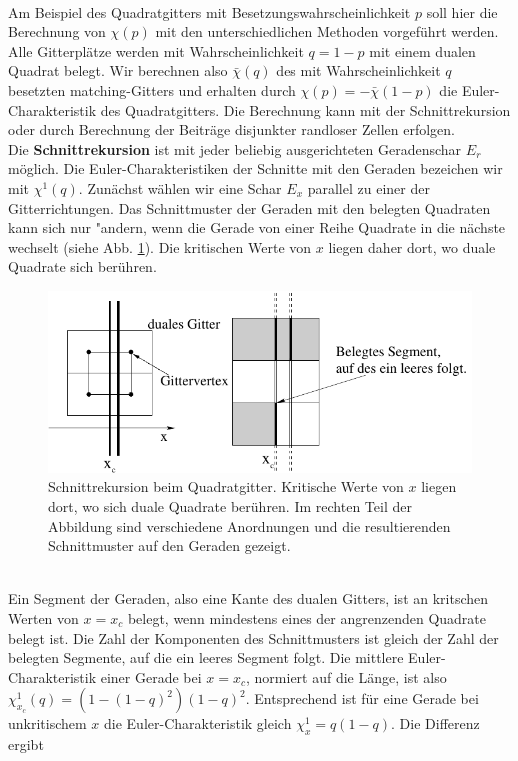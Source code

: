 \\Am Beispiel des Quadratgitters mit Besetzungswahrscheinlichkeit $p$ soll hier die Berechnung von $\chi(p)$ mit den unterschiedlichen Methoden vorgef\"uhrt werden. Alle Gitterpl\"atze werden mit Wahrscheinlichkeit $q=1-p$ mit einem dualen Quadrat belegt. Wir berechnen also $\bar{\chi}(q)$ des mit Wahrscheinlichkeit $q$ besetzten matching-Gitters und erhalten durch $\chi(p)=-\bar{\chi}(1-p)$ die Euler-Charakteristik des Quadratgitters. Die Berechnung kann mit der Schnittrekursion oder durch Berechnung der Beitr\"age disjunkter randloser Zellen erfolgen.\\
Die \textbf{Schnittrekursion} ist mit jeder beliebig ausgerichteten Geradenschar $E_r$ m\"oglich. Die Euler-Charakteristiken der Schnitte mit den Geraden bezeichen wir mit $\chi^1(q)$. Zun\"achst w\"ahlen wir eine Schar $E_x$ parallel zu einer der Gitterrichtungen. Das Schnittmuster der Geraden mit den belegten Quadraten kann sich nur "andern, wenn die Gerade von einer Reihe Quadrate in die n\"achste wechselt (siehe Abb. \ref{fig:schnittquadrat}). Die kritischen Werte von $x$ liegen daher dort, wo duale Quadrate sich ber\"uhren.  
\begin{figure}[hbtp]
  \centering
  \includegraphics{./Euler-figs/schnittquadrat}
  \caption{Schnittrekursion beim Quadratgitter. Kritische Werte von $x$ liegen dort, wo sich duale Quadrate ber\"uhren. Im rechten Teil der Abbildung sind verschiedene Anordnungen und die resultierenden Schnittmuster auf den Geraden gezeigt.}
  \label{fig:schnittquadrat}
\end{figure}
\\Ein Segment der Geraden, also eine Kante des dualen Gitters, ist an kritschen Werten von $x=x_c$ belegt, wenn mindestens eines der angrenzenden Quadrate belegt ist. Die Zahl der Komponenten des Schnittmusters ist gleich der Zahl der belegten Segmente, auf die ein leeres Segment folgt. Die mittlere Euler-Charakteristik einer Gerade bei $x=x_c$, normiert auf die L\"ange, ist also $\chi^1_{x_c}(q)=(1-(1-q)^2)(1-q)^2$. Entsprechend ist f\"ur eine Gerade bei unkritischem $x$ die Euler-Charakteristik gleich $\chi^1_{x}=q(1-q)$. Die Differenz ergibt 
